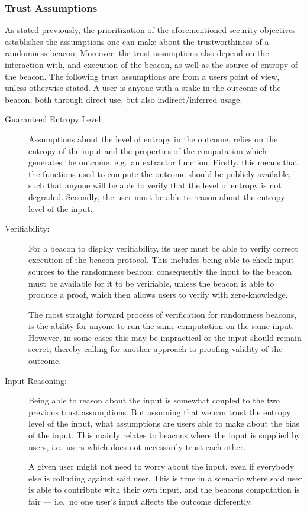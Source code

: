 \subsubsection{Trust Assumptions}\label{ssub:trust_assumptions}
As stated previously, the prioritization of the aforementioned security objectives establishes the assumptions one can make about the trustworthiness of a randomness beacon.
Moreover, the trust assumptions also depend on the interaction with, and execution of the beacon, as well as the source of entropy of the beacon.
The following trust assumptions are from a users point of view, unless otherwise stated.
A user is anyone with a stake in the outcome of the beacon, both through direct use, but also indirect/inferred usage.
\begin{description}

    \item [Guaranteed Entropy Level:]
        Assumptions about the level of entropy in the outcome, relies on the entropy of the input and the properties of the computation which generates the outcome, e.g.\ an extractor function.
        Firstly, this means that the functions used to compute the outcome should be publicly available, such that anyone will be able to verify that the level of entropy is not degraded.
        Secondly, the user must be able to reason about the entropy level of the input.

    \item [Verifiability:]
        For a beacon to display verifiability, its user must be able to verify correct execution of the beacon protocol.
        This includes being able to check input sources to the randomness beacon;
        consequently the input to the beacon must be available for it to be verifiable, unless the beacon is able to produce a proof, which then allows users to verify with zero-knowledge.

        The most straight forward process of verification for randomness beacons, is the ability for anyone to run the same computation on the same input.
        However, in some cases this may be impractical or the input should remain secret; thereby calling for another approach to proofing validity of the outcome.

    \item [Input Reasoning:]
        Being able to reason about the input is somewhat coupled to the two previous trust assumptions.
        But assuming that we can trust the entropy level of the input, what assumptions are users able to make about the bias of the input.
        This mainly relates to beacons where the input is supplied by users, i.e.\ users which does not necessarily trust each other.

        A given user might not need to worry about the input, even if everybody else is colluding against said user.
        This is true in a scenario where said user is able to contribute with their own input, and the beacons computation is fair
        --- i.e.\ no one user's input affects the outcome differently.

\end{description}

